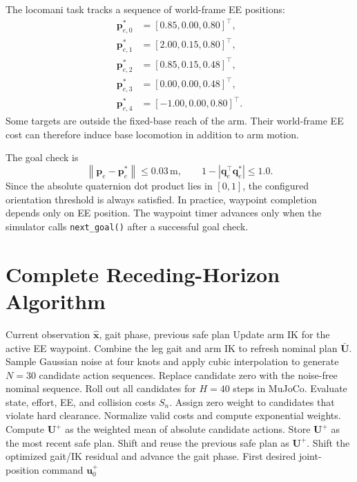 \documentclass[11pt,a4paper]{article}
\newcommand{\norm}[1]{\left\lVert #1 \right\rVert}
\newcommand{\code}[1]{\texttt{#1}}
\begin{document}
The locomani task tracks a sequence of world-frame EE positions:
\begin{equation}
\begin{split}
  \bm{p}_{e,0}^{*}&=[0.85,0.00,0.80]^\top,\\
  \bm{p}_{e,1}^{*}&=[2.00,0.15,0.80]^\top,\\
  \bm{p}_{e,2}^{*}&=[0.85,0.15,0.48]^\top,\\
  \bm{p}_{e,3}^{*}&=[0.00,0.00,0.48]^\top,\\
  \bm{p}_{e,4}^{*}&=[-1.00,0.00,0.80]^\top.
\end{split}
\end{equation}
Some targets are outside the fixed-base reach of the arm. Their world-frame
EE cost can therefore induce base locomotion in addition to arm motion.

The goal check is
\begin{equation}
  \norm{\bm{p}_e-\bm{p}_e^*}\leq0.03\,\mathrm{m},
  \qquad
  1-\left|\bm{q}_e^\top\bm{q}_e^*\right|\leq1.0.
\end{equation}
Since the absolute quaternion dot product lies in $[0,1]$, the configured
orientation threshold is always satisfied. In practice, waypoint completion
depends only on EE position. The waypoint timer advances only when the
simulator calls \code{next\_goal()} after a successful goal check.


\section{Complete Receding-Horizon Algorithm}

\begin{algorithm}[ht]
\caption{\code{legged\_mani} locomani MPPI update}
\label{alg:locomani_mppi}
\begin{algorithmic}[1]
  \REQUIRE Current observation $\hat{\bm{x}}$, gait phase, previous safe plan
  \STATE Update arm IK for the active EE waypoint.
  \STATE Combine the leg gait and arm IK to refresh nominal plan
         $\bar{\bm{U}}$.
  \STATE Sample Gaussian noise at four knots and apply cubic interpolation to
         generate $N=30$ candidate action sequences.
  \STATE Replace candidate zero with the noise-free nominal sequence.
  \STATE Roll out all candidates for $H=40$ steps in MuJoCo.
  \STATE Evaluate state, effort, EE, and collision costs $S_n$.
  \STATE Assign zero weight to candidates that violate hard clearance.
    \STATE Normalize valid costs and compute exponential weights.
    \STATE Compute $\bm{U}^{+}$ as the weighted mean of absolute candidate
           actions.
    \STATE Store $\bm{U}^{+}$ as the most recent safe plan.
  \ELSE
    \STATE Shift and reuse the previous safe plan as $\bm{U}^{+}$.
  \ENDIF
  \STATE Shift the optimized gait/IK residual and advance the gait phase.
  \RETURN First desired joint-position command $\bm{u}^{+}_0$
\end{algorithmic}
\end{algorithm}
\end{document}
